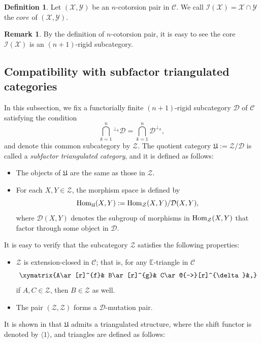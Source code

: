 \documentclass[a4paper,reqno,11pt]{amsart}
\theoremstyle{definition}
\newtheorem{definition}[theorem]{Definition}
\newtheorem{remark}[theorem]{Remark}
\def\C{\mathcal{C}}
\def\D{\mathcal{D}}
\def\X{\mathcal{X}}
\def\D{\mathcal{D}}
\def\Y{\mathcal{Y}}
\def\Z{\mathcal {Z}}
\def\I{\mathcal {I}}
\def\E{\mathbb{E}}
\providecommand{\Hom}{\mathop{\rm Hom}\nolimits}%
\begin{document}
\begin{definition}
Let $(\X,\Y)$ be an $n$-cotorsion pair in $\C$. We call $\I(\X)=\X\cap\Y$ the $core$ of $(\X,\Y)$.
\end{definition}


\begin{remark}\label{l}
By the definition of $n$-cotorsion pair, it is easy to see the core $\I(\X)$ is an $(n+1)$-rigid subcategory.
\end{remark}



\subsection{Compatibility with subfactor triangulated categories}
In this subsection, we fix a functorially finite $(n+1)$-rigid subcategory $\D$ of $\C$ satisfying the condition
\[
\bigcap\limits_{k=1}^{n}{}^{\perp_k}\D = \bigcap\limits_{k=1}^{n}\D^{\perp_k},
\]
and denote this common subcategory by $\Z$. The quotient category $\mathfrak{U} := \Z/\D$ is called a \emph{subfactor triangulated category}, and it is defined as follows:

\begin{itemize}
  \item[(1)] The objects of $\mathfrak{U}$ are the same as those in $\Z$.
  \item[(2)] For each $X,Y \in \Z$, the morphism space is defined by
  \[
  \Hom_{\mathfrak{U}}(X,Y) := \Hom_{\Z}(X,Y)/\D(X,Y),
  \]
  where $\D(X,Y)$ denotes the subgroup of morphisms in $\Hom_{\Z}(X,Y)$ that factor through some object in $\D$.
\end{itemize}

It is easy to verify that the subcategory $\Z$ satisfies the following properties:

\begin{itemize}
  \item[(1)] $\Z$ is extension-closed in $\C$; that is, for any $\E$-triangle in $\C$
  \[
  \xymatrix{A\ar[r]^{f}& B\ar[r]^{g}& C\ar@{-->}[r]^{\delta}&,}
  \]
  if $A,C \in \Z$, then $B \in \Z$ as well.

  \item[(2)] The pair $(\Z, \Z)$ forms a $\D$-mutation pair.
\end{itemize}

It is shown in \cite[Theorem 3.13]{ZZ1} that $\mathfrak{U}$ admits a triangulated structure, where the shift functor is denoted by $\langle1\rangle$, and triangles are defined as follows:
\end{document}
